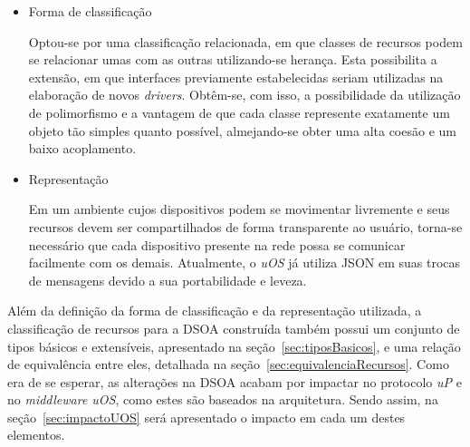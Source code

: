 \begin{itemize}
	\item Forma de classificação

	Optou-se por uma classificação relacionada, em que classes de recursos podem se relacionar umas com as outras utilizando-se herança. Esta possibilita a extensão, em que interfaces previamente estabelecidas seriam utilizadas na elaboração de novos \emph{drivers}. Obtêm-se, com isso, a possibilidade da utilização de polimorfismo e a vantagem de que cada classe represente exatamente um objeto tão simples quanto possível, almejando-se obter uma alta coesão e um baixo acoplamento.

	\item Representação

	Em um ambiente cujos dispositivos podem se movimentar livremente e seus recursos devem ser compartilhados de forma transparente ao usuário, torna-se necessário que cada dispositivo presente na rede possa se comunicar facilmente com os demais. Atualmente, o \emph{uOS} já utiliza JSON em suas trocas de mensagens devido a sua portabilidade e leveza.

	\begin{comment}
	Tal formato apresenta as seguintes características:
	
		\begin{itemize}
	 		\item Baixo custo computacional~\cite{comparativojson};
	 		\item É auto-descritivo, o que facilita os processos de leitura e escrita por seres-humanos~\cite{json};
	 		\item É estruturado, o que facilita sua criação e análise por computadores~\cite{json};
	 		\item É independente de plataforma, pois utiliza UTF-8 como codificação~\cite{utf8}.
	 	\end{itemize}
	 \end{comment}
\end{itemize}

Além da definição da forma de classificação e da representação utilizada, a classificação de recursos para a DSOA construída também possui um conjunto de tipos básicos e extensíveis, apresentado na seção~\ref{sec:tiposBasicos}, e uma relação de equivalência entre eles, detalhada na seção~\ref{sec:equivalenciaRecursos}. Como era de se esperar, as alterações na DSOA acabam por impactar no protocolo \emph{uP} e no \emph{middleware uOS}, como estes são baseados na arquitetura. Sendo assim, na seção~\ref{sec:impactoUOS} será apresentado o impacto em cada um destes elementos.

